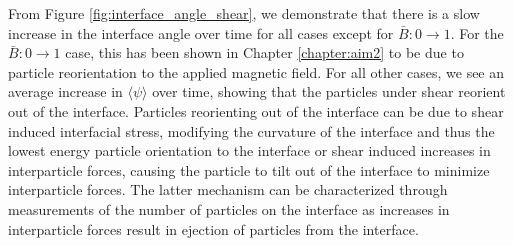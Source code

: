 From Figure \ref{fig:interface_angle_shear}, we demonstrate that there is a slow increase in the interface angle over time for all cases
except for $\bar{B}: 0 \to 1$. For the $\bar{B}: 0 \to 1$ case, this has been shown in Chapter \ref{chapter:aim2} to be due to particle
reorientation to the applied magnetic field. For all other cases, we see an average increase in $\langle \psi \rangle$ over time, showing
that the particles under shear reorient out of the interface. Particles reorienting out of the interface can be due to shear induced interfacial 
stress, modifying the curvature of the interface and thus the lowest energy particle orientation to the interface or shear induced increases in
interparticle forces, causing the particle to tilt out of the interface to minimize interparticle forces. The latter 
mechanism can be characterized through measurements of the number of particles on the interface as increases in interparticle forces result in ejection of
particles from the interface. 




